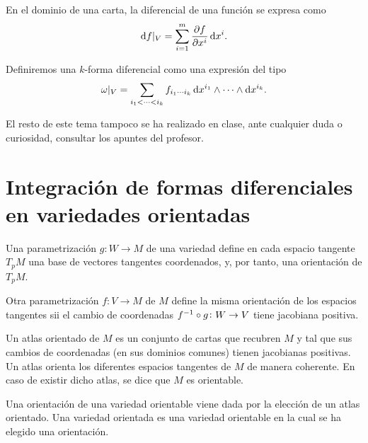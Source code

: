 \begin{prop}
    En el dominio de una carta, la diferencial de una función se expresa como
    \[
        \dif f \vert_V = \sum^m_{i= 1} \frac{\partial f}{\partial x^i} \dif x^i.
    \]
\end{prop}

\begin{defi}
    Definiremos una $k$-forma diferencial como una expresión del tipo
    \[
        \omega\vert_V = \sum_{i_1 < \cdots < i_k} f_{i_1 \cdots i_k} \dif x^{i_1} \wedge \cdots \wedge \dif x^{i_k}.
    \]
\end{defi}

El resto de este tema tampoco se ha realizado en clase, ante cualquier duda o curiosidad, consultar los apuntes del profesor.

\section[Integración de formas diferenciales en variedades orientadas]
    {Integración de formas diferenciales en variedades orientadas
    }

\begin{defi}
    Una parametrización $g \colon W \to M$ de una variedad define en cada espacio tangente $T_pM$ una base de vectores tangentes
    coordenados, y, por tanto, una orientación de $T_pM$.

    Otra parametrización $f \colon V \to M$ de $M$ define la misma orientación de los espacios tangentes sii el cambio de coordenadas
    $f^{-1} \circ g \colon W \to V$ tiene jacobiana positiva.
\end{defi}

\begin{defi}
    Un atlas orientado de $M$ es un conjunto de cartas que recubren $M$ y tal que sus cambios de coordenadas (en sus dominios comunes)
    tienen jacobianas positivas. Un atlas orienta los diferentes espacios tangentes de $M$ de manera coherente. En caso de existir dicho atlas,
    se dice que $M$ es orientable.
\end{defi}

\begin{defi}
    Una orientación de una variedad orientable viene dada por la elección de un atlas orientado. Una variedad orientada es una variedad
    orientable en la cual se ha elegido una orientación.
\end{defi}

